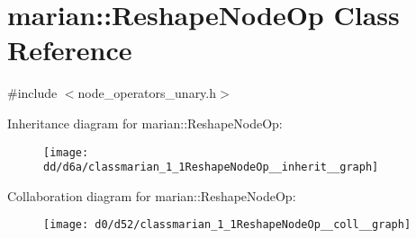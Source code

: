 \hypertarget{classmarian_1_1ReshapeNodeOp}{}\section{marian\+:\+:Reshape\+Node\+Op Class Reference}
\label{classmarian_1_1ReshapeNodeOp}


{\ttfamily \#include $<$node\+\_\+operators\+\_\+unary.\+h$>$}



Inheritance diagram for marian\+:\+:Reshape\+Node\+Op\+:
\nopagebreak
\begin{figure}[H]
\begin{center}
\leavevmode
\texttt{[image: dd/d6a/classmarian\_1\_1ReshapeNodeOp\_\_inherit\_\_graph]}
\end{center}
\end{figure}


Collaboration diagram for marian\+:\+:Reshape\+Node\+Op\+:
\nopagebreak
\begin{figure}[H]
\begin{center}
\leavevmode
\texttt{[image: d0/d52/classmarian\_1\_1ReshapeNodeOp\_\_coll\_\_graph]}
\end{center}
\end{figure}

